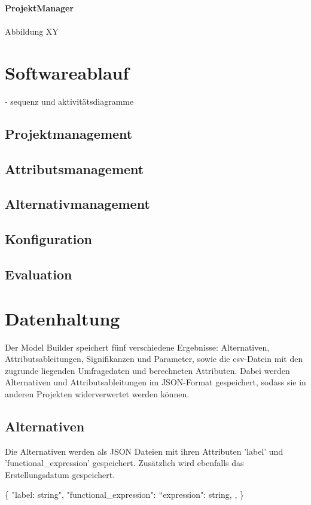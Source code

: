 \documentclass{article}
\begin{document}
\newpage
\textbf{\large{ProjektManager}}\\\\
Abbildung XY






\section{Softwareablauf}
- sequenz und aktivitätsdiagramme
\subsection{Projektmanagement}
\subsection{Attributsmanagement}
\subsection{Alternativmanagement}
\subsection{Konfiguration}
\subsection{Evaluation}


\section{Datenhaltung}

Der Model Builder speichert fünf verschiedene Ergebnisse: Alternativen, Attributsableitungen, Signifikanzen und Parameter, sowie die csv-Datein mit den zugrunde liegenden Umfragedaten und berechneten Attributen. Dabei werden Alternativen und Attributsableitungen im JSON-Format gespeichert, sodass sie in anderen Projekten widerverwertet werden können.

\subsection{Alternativen}
Die Alternativen werden als JSON Dateien mit ihren Attributen 'label' und 'functional\_expression' gespeichert. Zusätzlich wird ebenfalls das Erstellungsdatum gespeichert.

\newline
\{ \newline
    "label: string", \newline
    "functional\_expression": {\newline
        \texttt{"}expression": string, \newline
    }, \newline
\} \newline
\newline
\end{document}
